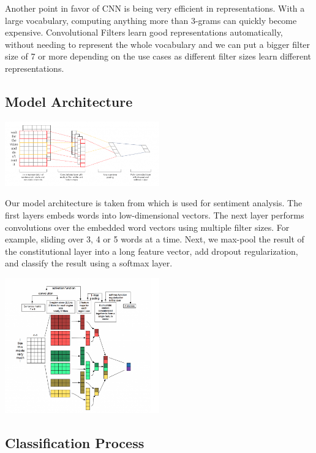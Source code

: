 \documentclass[10pt, oneside]{article}
\begin{document}
\begin{multicols}{2}
Another point in favor of CNN is being very efficient in representations.  With a large vocabulary, computing anything more than 3-grams can quickly become expensive.  Convolutional Filters learn good representations automatically, without needing to represent the whole vocabulary and we can put a bigger filter size of 7 or more depending on the use cases as different filter sizes learn different representations. 

\subsection{Model Architecture}

\includegraphics[width=0.5\textwidth]{images/cnn_architecture1.png}

Our model architecture is taken from \cite{Kim2014} which is used for sentiment analysis. The first layers embeds words into low-dimensional vectors. The next layer performs convolutions over the embedded word vectors using multiple filter sizes. For example, sliding over 3, 4 or 5 words at a time. Next, we max-pool the result of the constitutional layer into a long feature vector, add dropout regularization, and classify the result using a softmax layer.

\includegraphics[width=0.5\textwidth]{images/cnn_architecture2.png}

\subsection{Classification Process}


\end{multicols}
\end{document}
